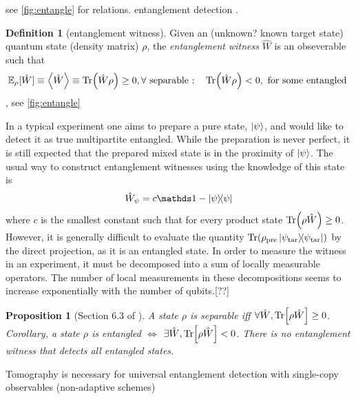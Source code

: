\documentclass[
aps,
pra,
floatfix,
]{revtex4-2}
\theoremstyle{plain}
\newtheorem{proposition}{Proposition}
\theoremstyle{definition}
\newtheorem{definition}{Definition}
\newtheorem{remark}{Remark}
\newcommand{\ew}{\hat{W}}
\newcommand{\target}{\textup{tar}}
\newcommand{\prepare}{\textup{pre}}
\newcommand{\ob}{\hat{O}}
\newcommand{\dm}{\rho}
\begin{document}
see \cref{fig:entangle} for relations.
entanglement detection \cite{guhneEntanglementDetection2009}.
\begin{definition}[entanglement witness]\label{def:entanglement_witness}
	Given an (unknown? known target state) quantum state (density matrix) $\dm$, the \emph{entanglement witness} $\ew$ is an obseverable such that
	\begin{equation}
		\expectation_{\dm}[\ew]\equiv\expval{\ew}\equiv
		\Tr(\ew\dm) \ge 0 , \forall \text{ separable };\quad
		\Tr(\ew\dm) < 0 , \text{ for some entangled }
	\end{equation}
	\cite{terhalBellInequalitiesSeparability2000}, see \cref{fig:entangle}
\end{definition}

In a typical experiment one aims to prepare a pure state, $\ket{\psi}$, and would like to detect it as true multipartite entangled. 
While the preparation is never perfect, it is still expected that the prepared mixed state is in the proximity of $\ket{\psi}$. The usual way to construct entanglement witnesses using the knowledge of this state is
\begin{equation}
	\ew_{\psi} = c\identity - \op{\psi} 
	\label{eq:entanglement_witness}
\end{equation}
where $c$ is the smallest constant such that for every product state $\Tr(\dm\ew)\ge 0$.
However, it is generally difficult to evaluate the quantity $\Tr(\dm_{\prepare} \op{\psi_{\target}})$ by the direct projection, as it is an entangled state.
In order to measure the witness in an experiment, it must be decomposed into a sum of locally measurable operators. The number of local measurements in these decompositions seems to increase exponentially with the number of qubits.[??]
\begin{proposition}[Section 6.3 of \cite{heinosaariMathematicalLanguageQuantum2011}]
	A state $\dm$ is separable iff $\forall \ew,\Tr[\dm \ew]\ge 0$. 
	Corollary, a state $\dm$ is entangled $\iff$  $\exists \ew,\Tr[\dm \ew]<0$. 
	There is no entanglement witness that detects all entangled states.
\end{proposition}
Tomography is necessary for universal entanglement detection with single-copy observables (non-adaptive schemes) \cite{luTomographyNecessaryUniversal2016}
\end{document}
